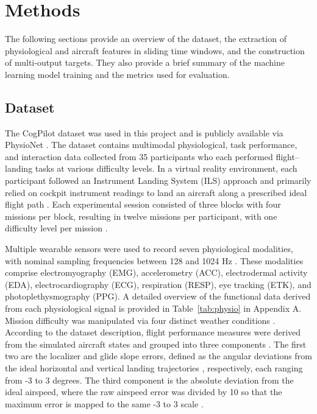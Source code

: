 \documentclass[11pt, a4paper]{article}
\begin{document}
\section{Methods}
The following sections provide an overview of the dataset, the extraction of physiological and aircraft features in sliding time windows, and the construction of multi‑output targets. They also provide a brief summary of the machine learning model training and the metrics used for evaluation.

\subsection{Dataset}
The CogPilot \cite{rao-2022} dataset was used in this project and is publicly available via PhysioNet \cite{goldberger-2000}. The dataset contains multimodal physiological, task performance, and interaction data collected from 35 participants who each performed flight–landing tasks at various difficulty levels. In a virtual reality environment, each participant followed an Instrument Landing System (ILS) approach and primarily relied on cockpit instrument readings to land an aircraft along a prescribed ideal flight path \cite{rao-2022}. Each experimental session consisted of three blocks with four missions per block, resulting in twelve missions per participant, with one difficulty level per mission \cite{rao-2022}.

Multiple wearable sensors were used to record seven physiological modalities, with nominal sampling frequencies between 128 and 1024 Hz \cite{rao-2022}. These modalities comprise electromyography (EMG), accelerometry (ACC), electrodermal activity (EDA), electrocardiography (ECG), respiration (RESP), eye tracking (ETK), and photoplethysmography (PPG). A detailed overview of the functional data derived from each physiological signal is provided in Table~\ref{tab:physio} in Appendix A. Mission difficulty was manipulated via four distinct weather conditions \cite{rao-2022}. According to the dataset description, flight performance measures were derived from the simulated aircraft states and grouped into three components \cite{rao-2022}. The first two are the localizer and glide slope errors, defined as the angular deviations from the ideal horizontal and vertical landing trajectories \cite{rao-2022}, respectively, each ranging from -3 to 3 degrees. The third component is the absolute deviation from the ideal airspeed, where the raw airspeed error was divided by 10 so that the maximum error is mapped to the same -3 to 3 scale \cite{rao-2022}.
\end{document}
